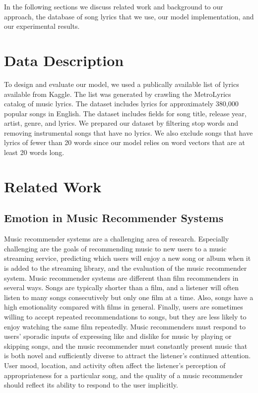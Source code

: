 \documentclass[10pt,twocolumn]{article}
\begin{document}
In the following sections we discuss related work and background to our approach, the database of song lyrics that we use, our model implementation, and our experimental results.

\section{Data Description}
To design and evaluate our model, we used a publically available list of lyrics available from Kaggle. \cite{a14}  The list was generated by crawling the MetroLyrics catalog of music lyrics. \cite{a15}  The dataset includes lyrics for approximately 380,000 popular songs in English.  The dataset includes fields for song title, release year, artist, genre, and lyrics. We prepared our dataset by filtering stop words and removing instrumental songs that have no lyrics.  We also exclude songs that have lyrics of fewer than 20 words since our model relies on word vectors that are at least 20 words long.

\section{Related Work}
\subsection{Emotion in Music Recommender Systems}
Music recommender systems are a challenging area of research.  Especially challenging are the goals of recommending music to new users to a music streaming service, predicting which users will enjoy a new song or album when it is added to the streaming library, and the evaluation of the music recommender system. \cite{a1}  Music recommender systems are different than film recommenders in several ways.  Songs are typically shorter than a film, and a listener will often listen to many songs consecutively but only one film at a time.  Also, songs have a high emotionality compared with films in general.  Finally, users are sometimes willing to accept repeated recommendations to songs, but they are less likely to enjoy watching the same film repeatedly.  Music recommenders must respond to users' sporadic inputs of expressing like and dislike for music by playing or skipping songs, and the music recommender must constantly present music that is both novel and sufficiently diverse to attract the listener's continued attention.  User mood, location, and activity often affect the listener's perception of appropriateness for a particular song, and the quality of a music recommender should reflect its ability to respond to the user implicitly.
\end{document}
